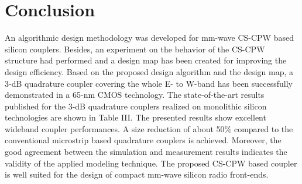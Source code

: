 \documentclass[journal]{IEEEtran}
\begin{document}




\section{Conclusion}
An algorithmic design methodology was developed for mm-wave CS-CPW based silicon couplers. Besides, an experiment on the behavior of the CS-CPW structure had performed and a design map has been created for improving the design efficiency. Based on the proposed design algorithm and the design map, a 3-dB quadrature coupler covering the whole E- to W-band has been successfully demonstrated in a 65-nm CMOS technology. The state-of-the-art results published for the 3-dB quadrature couplers realized on monolithic silicon technologies are shown in Table III. The presented results show excellent wideband coupler performances. A size reduction of about 50$\%$ compared to the conventional microstrip based quadrature couplers is achieved. Moreover, the good
agreement between the simulation and measurement results indicates the validity of the applied modeling technique. The proposed CS-CPW based coupler is well suited for the design of compact mm-wave silicon radio front-ends.







%
\end{document}
